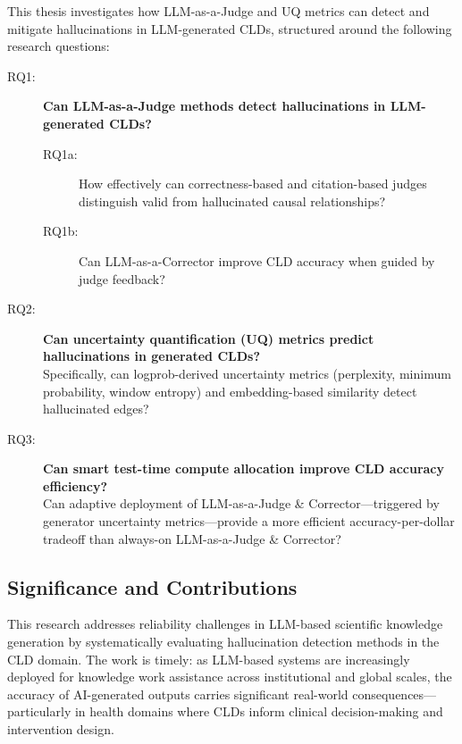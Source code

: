 This thesis investigates how LLM-as-a-Judge and UQ metrics can detect and mitigate hallucinations in LLM-generated CLDs, structured around the following research questions:

\begin{description}
    \item[RQ1:] \textbf{Can LLM-as-a-Judge methods detect hallucinations in LLM-generated CLDs?}
    \begin{description}
        \item[RQ1a:] How effectively can correctness-based and citation-based judges distinguish valid from hallucinated causal relationships?
        \item[RQ1b:] Can LLM-as-a-Corrector improve CLD accuracy when guided by judge feedback?
    \end{description}
    
    \item[RQ2:] \textbf{Can uncertainty quantification (UQ) metrics predict hallucinations in generated CLDs?}\\
    Specifically, can logprob-derived uncertainty metrics (perplexity, minimum probability, window entropy) and embedding-based similarity detect hallucinated edges?
    
    \item[RQ3:] \textbf{Can smart test-time compute allocation improve CLD accuracy efficiency?}\\
    Can adaptive deployment of LLM-as-a-Judge \& Corrector---triggered by generator uncertainty metrics---provide a more efficient accuracy-per-dollar tradeoff than always-on LLM-as-a-Judge \& Corrector?
\end{description}

\subsection*{Significance and Contributions}

This research addresses reliability challenges in LLM-based scientific knowledge generation by systematically evaluating hallucination detection methods in the CLD domain. The work is timely: as LLM-based systems are increasingly deployed for knowledge work assistance across institutional and global scales, the accuracy of AI-generated outputs carries significant real-world consequences---particularly in health domains where CLDs inform clinical decision-making and intervention design.


